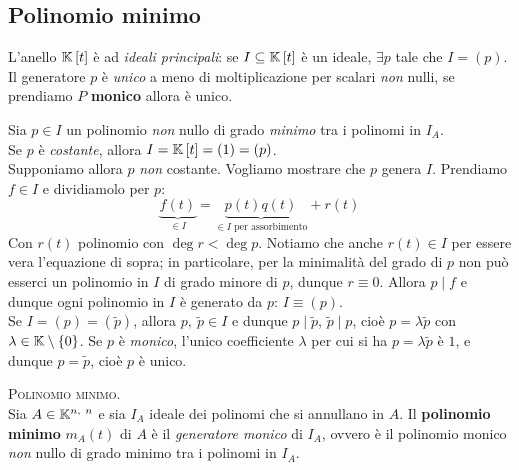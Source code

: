 \subsection{Polinomio minimo}
\begin{proposition}
	L'anello $\mathbb{K}\left[t\right]$ è ad \textit{ideali principali}: se $I\subseteq \mathbb{K}\left[t\right]$ è un ideale, $\exists p$ tale che $I=\left(p\right)$. Il generatore $p$ è \textit{unico} a meno di moltiplicazione per scalari \textit{non} nulli, se prendiamo $P$ \textbf{monico} allora è unico.
\end{proposition}
\begin{demonstration}
Sia $p\in I$ un polinomio \textit{non} nullo di grado \textit{minimo} tra i polinomi in $I_A$.\\
Se $p$ è \textit{costante}, allora $I=\mathbb{K}\left[t\right]=\left(1\right)=\left(p\right)$.\\
Supponiamo allora $p$ \textit{non} costante. Vogliamo mostrare che $p$ genera $I$.
Prendiamo $f\in I$ e dividiamolo per $p$:
\begin{equation*}
	\underbrace{f\left(t\right)}_{\in I}=\underbrace{p\left(t\right)q\left(t\right)}_{\in I\text{ per assorbimento}}+r\left(t\right)
\end{equation*}
Con $r\left(t\right)$ polinomio con $\deg r < \deg p$. Notiamo che anche $r\left(t\right)\in I$ per essere vera l'equazione di sopra; in particolare, per la minimalità del grado di $p$ non può esserci un polinomio in $I$ di grado minore di $p$, dunque $r\equiv 0$. Allora $p\mid f$ e dunque ogni polinomio in $I$ è generato da $p$: $I\equiv\left(p\right)$.\\
Se $I=\left(p\right)=\left(\widetilde{p}\right)$, allora $p,\ \widetilde{p}\in I$ e dunque $p\mid \widetilde{p}$, $\widetilde{p}\mid p$, cioè $p=\lambda\widetilde{p}$ con $\lambda\in\mathbb{K}\setminus\left\{0\right\}$. Se $p$ è \textit{monico}, l'unico coefficiente $\lambda$ per cui si ha $p=\lambda\widetilde{p}$ è $1$, e dunque $p=\widetilde{p}$, cioè $p$ è unico.
\end{demonstration}
\begin{define}\textsc{Polinomio minimo.}\\
	Sia $A\in\mathbb{K}^{n,\ n}$ e sia $I_A$ ideale dei polinomi che si annullano in $A$. Il \textbf{polinomio minimo} $m_A\left(t\right)$ di $A$ è il  \textit{generatore monico} di $I_A$, ovvero è il polinomio monico \textit{non} nullo di grado minimo tra i polinomi in $I_A$.
\end{define}
